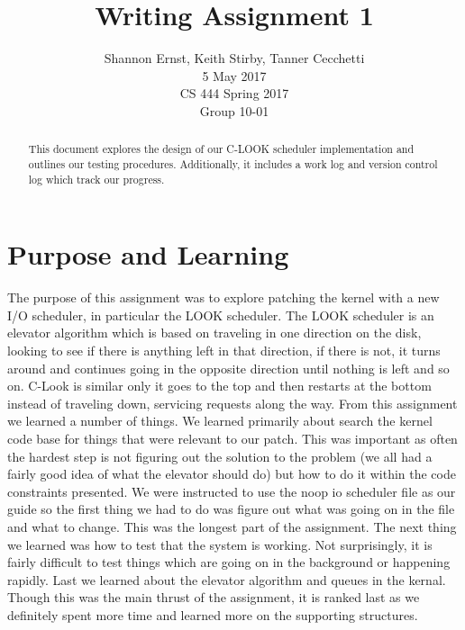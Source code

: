\documentclass[letterpaper,10pt,serif,draftclsnofoot,onecolumn,compsoc,titlepage]{IEEEtran}
\title{Writing Assignment 1}
\author{Shannon Ernst, Keith Stirby, Tanner Cecchetti\\ 5 May 2017 \\ CS 444 Spring 2017 \\ Group 10-01}
\begin{document}
\maketitle
\begin{abstract}

This document explores the design of our C-LOOK scheduler implementation and
outlines our testing procedures. Additionally, it includes a work log and
version control log which track our progress.

\end{abstract}
\newpage
\tableofcontents
\newpage
\section{Purpose and Learning}
The purpose of this assignment was to explore patching the kernel with a
new I/O scheduler, in particular the LOOK scheduler. The LOOK scheduler is
an elevator algorithm which is based on traveling in one direction on the
disk, looking to see if there is anything left in that direction, if there
is not, it turns around and continues going in the opposite direction
until nothing is left and so on. C-Look is similar only it goes to the
top and then restarts at the bottom instead of traveling down, servicing
requests along the way. From this assignment we learned a number of things.
We learned primarily about search the kernel code base for things that
were relevant to our patch. This was important as often the hardest step
is not figuring out the solution to the problem (we all had a fairly good
idea of what the elevator should do) but how to do it within the code
constraints presented. We were instructed to use the noop io scheduler file
as our guide so the first thing we had to do was figure out what was going
on in the file and what to change. This was the longest part of the
assignment. The next thing we learned was how to test that the system is
working. Not surprisingly, it is fairly difficult to test things which
are going on in the background or happening rapidly. Last we learned about
the elevator algorithm and queues in the kernal. Though this was the main
thrust of the assignment, it is ranked last as we definitely spent more
time and learned more on the supporting structures.
\end{document}
